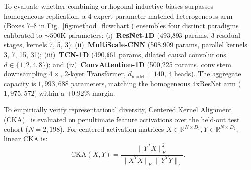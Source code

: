 \documentclass{ICIC2026}
\begin{document}
To evaluate whether combining orthogonal inductive biases surpasses homogeneous replication, a 4-expert parameter-matched heterogeneous arm (Boxes 7--8 in Fig.~\ref{fig:method_flowchart}) ensembles four distinct paradigms calibrated to $\sim 500\text{K}$ parameters: (i)~\textbf{ResNet-1D} (493,893 params, 3 residual stages, kernels 7, 5, 3); (ii)~\textbf{MultiScale-CNN} (508,909 params, parallel kernels 3, 7, 15, 31); (iii)~\textbf{TCN-1D} (490,661 params, dilated causal convolutions $d \in \{1, 2, 4, 8\}$); and (iv)~\textbf{ConvAttention-1D} (500,225 params, conv stem downsampling $4\times$, 2-layer Transformer, $d_{\text{model}}=140$, 4 heads). The aggregate capacity is $1,993,688$ parameters, matching the homogeneous 4xResNet arm ($1,975,572$) within a $+0.92\%$ margin.

To empirically verify representational diversity, Centered Kernel Alignment (CKA)~\cite{kornblith2019similarity} is evaluated on penultimate feature activations over the held-out test cohort ($N = 2,198$). For centered activation matrices $X \in \mathbb{R}^{N \times D_1}, Y \in \mathbb{R}^{N \times D_2}$, linear CKA is:
\begin{equation}
\text{CKA}(X, Y) = \frac{\|Y^T X\|_F^2}{\|X^T X\|_F \|Y^T Y\|_F}.
\label{eq:cka}
\end{equation}

\begin{table}[t]
\caption{Fixed-Budget Multiplicity Performance Across 5 Seeds (Mean $\pm$ SD) within $\pm 3.0\%$ Parameter Budget on Held-Out PTB-XL Test Set ($N=2,198$)}
\label{tab:scaling_results}
\centering
\begin{ICICtable}
\end{ICICtable}
\end{table}
\end{document}
